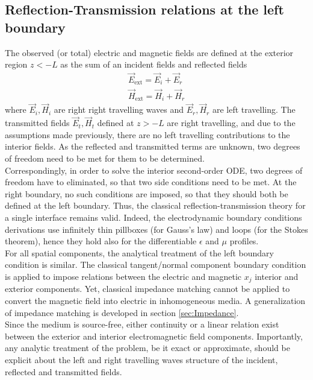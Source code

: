\documentclass[twocolumn,secnumarabic,amssymb, nobibnotes, aps, prd]{revtex4-1}
\begin{document}
\subsection{Reflection-Transmission relations at the left boundary}
The observed (or total) electric and magnetic fields  are defined at the exterior region $z<-L$ as the sum of an incident fields and reflected fields
\begin{subequations}
\begin{align}
\overrightarrow{E}_{\text{ext}} = \overrightarrow{E}_i + \overrightarrow{E}_r \\
\overrightarrow{H}_{\text{ext}} = \overrightarrow{H}_i + \overrightarrow{H}_r
\end{align} 
\end{subequations}
where $\overrightarrow{E}_i,\overrightarrow{H}_i$ are right right travelling waves and $\overrightarrow{E}_r,\overrightarrow{H}_r$ are left travelling. The transmitted fields $\overrightarrow{E}_{t},\overrightarrow{H}_t$ defined at $z>-L$ are right travelling, and due to the assumptions made previously, there are no left travelling contributions to the interior fields. As the reflected and transmitted terms are unknown, two degrees of freedom need to be met for them to be determined.\\
Correspondingly, in order to solve the interior second-order ODE, two degrees of freedom have to eliminated, so that two side conditions need to be met. At the right boundary, no such conditions are imposed, so that they should both be defined at the left boundary. Thus, the classical reflection-transmission theory for a single interface \cite{cheng2006fieldAndWave} remains valid. Indeed, the electrodynamic boundary conditions derivations use infinitely thin pillboxes (for Gauss's law) and loops (for the Stokes theorem), hence they hold also for the differentiable $\epsilon$ and $\mu$ profiles.\\
For all spatial components, the analytical treatment of the  left boundary condition is similar. The classical tangent/normal component boundary condition is applied to impose relations between the electric and magnetic $x_j$ interior and exterior components. Yet, classical impedance matching cannot be applied to convert the magnetic field into electric in inhomogeneous media. A generalization of impedance matching is developed in section \ref{sec:Impedance}. \\ 
Since the medium is source-free, either continuity or a linear relation exist between the exterior and interior electromagnetic field components. Importantly, any analytic treatment of the problem, be it exact or approximate, should be explicit about the left and right travelling waves structure of the incident, reflected and transmitted fields.\\
  
\end{document}
